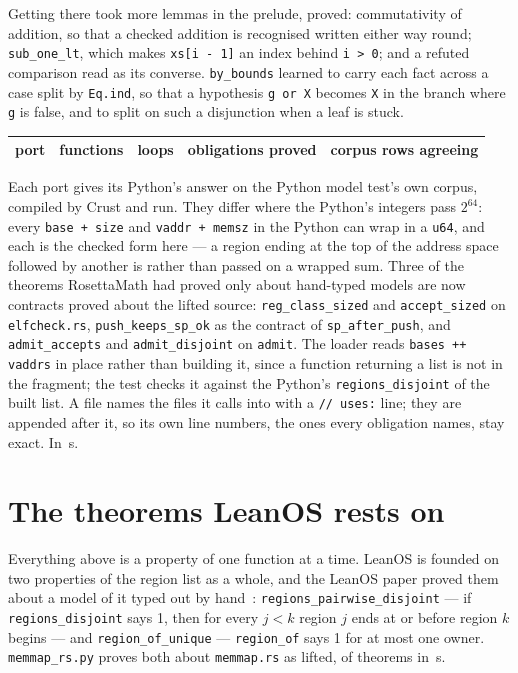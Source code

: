 \documentclass[11pt]{article}
\begin{document}
Getting there took \loopLemmas{} more lemmas in the prelude,
\loopLemmasAll{} proved: commutativity of addition, so that a checked
addition is recognised written either way round; \texttt{sub\_one\_lt},
which makes \texttt{xs[i - 1]} an index behind \texttt{i > 0}; and a
refuted comparison read as its converse.  \texttt{by\_bounds} learned to
carry each fact across a case split by \texttt{Eq.ind}, so that a
hypothesis \texttt{g or X} becomes \texttt{X} in the branch where
\texttt{g} is false, and to split on such a disjunction when a leaf is
stuck.

\begin{center}
\small
\begin{tabular}{lrrrr}
\toprule
port & functions & loops & obligations proved & corpus rows agreeing \\
\midrule

\end{tabular}
\end{center}

Each port gives its Python's answer on the Python model test's own
corpus, compiled by Crust and run.  They differ where the Python's integers
pass $2^{64}$: every \texttt{base + size} and \texttt{vaddr + memsz} in the
Python can wrap in a \texttt{u64}, and each is the checked form here --- a
region ending at the top of the address space followed by another is
\portWrapRefused{} rather than passed on a wrapped sum.  Three of the
theorems RosettaMath had proved only about hand-typed models are now
contracts proved about the lifted source: \texttt{reg\_class\_sized} and
\texttt{accept\_sized} on \texttt{elfcheck.rs}, \texttt{push\_keeps\_sp\_ok}
as the contract of \texttt{sp\_after\_push}, and \texttt{admit\_accepts} and
\texttt{admit\_disjoint} on \texttt{admit}.  The loader reads
\texttt{bases ++ vaddrs} in place rather than building it, since a
function returning a list is not in the fragment; the test checks it
against the Python's \texttt{regions\_disjoint} of the built list.  A
file names the files it calls into with a \texttt{// uses:} line; they are
appended after it, so its own line numbers, the ones every obligation
names, stay exact.  In \portSeconds{}\,s.

\section{The theorems LeanOS rests on}\label{sec:founding}

Everything above is a property of one function at a time.  LeanOS is
founded on two properties of the region list as a whole, and the LeanOS
paper proved them about a model of it typed out by hand~\cite{hartshorn2026leanos}:
\texttt{regions\_pairwise\_disjoint} --- if \texttt{regions\_disjoint}
says 1, then for every $j < k$ region $j$ ends at or before region $k$
begins --- and \texttt{region\_of\_unique} --- \texttt{region\_of} says 1
for at most one owner.  \texttt{memmap\_rs.py} proves both about
\texttt{memmap.rs} as lifted, \foundingProved{} of \foundingTheorems{}
theorems in \foundingSeconds{}\,s.
\end{document}
